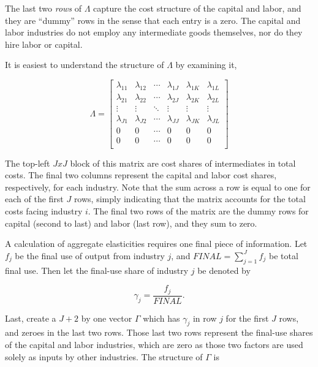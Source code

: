 \documentclass[11pt]{article}
\begin{document}
The last two \textit{rows} of $\Lambda$ capture the cost structure of the capital and labor, and they are ``dummy'' rows in the sense that each entry is a zero. The capital and labor industries do not employ any intermediate goods themselves, nor do they hire labor or capital.

It is easiest to understand the structure of $\Lambda$ by examining it,

\begin{equation}
	\Lambda = 
	\begin{bmatrix}
		\lambda_{11} & \lambda_{12} & \cdots & \lambda_{1J} & \lambda_{1K} & \lambda_{1L} \\
		\lambda_{21} & \lambda_{22} & \cdots & \lambda_{2J} & \lambda_{2K} & \lambda_{2L} \\
		\vdots       & \vdots       & \ddots & \vdots       & \vdots       & \vdots  \\
		\lambda_{J1} & \lambda_{J2} & \cdots & \lambda_{JJ} & \lambda_{JK} & \lambda_{JL} \\
		0 & 0 & \cdots & 0 & 0& 0 \\
		0 & 0 & \cdots & 0 & 0& 0 \\
	\end{bmatrix} \label{EQ_Lambda}
\end{equation} 

The top-left $JxJ$ block of this matrix are cost shares of intermediates in total costs. The final two columns represent the capital and labor cost shares, respectively, for each industry. Note that the sum across a row is equal to one for each of the first $J$ rows, simply indicating that the matrix accounts for the total costs facing industry $i$. The final two rows of the matrix are the dummy rows for capital (second to last) and labor (last row), and they sum to zero.

A calculation of aggregate elasticities requires one final piece of information. Let $f_j$ be the final use of output from industry $j$, and $FINAL = \sum_{j=1}^J f_j$ be total final use. Then let the final-use share of industry $j$ be denoted by

\begin{equation}
	\gamma_j = \frac{f_j}{FINAL}.
\end{equation}

Last, create a $J+2$ by one vector $\Gamma$ which has $\gamma_j$ in row $j$ for the first $J$ rows, and zeroes in the last two rows. Those last two rows represent the final-use shares of the capital and labor industries, which are zero as those two factors are used solely as inputs by other industries. The structure of $\Gamma$ is
\end{document}
